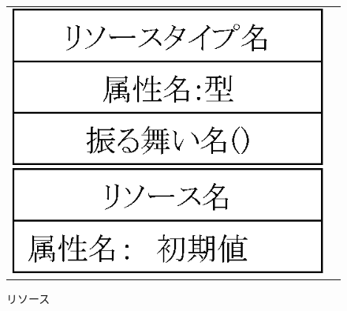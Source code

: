 \begin{figure}[p]
\begin{tabular}{cc}
\begin{minipage}{0.5\hsize}
\begin{center}
\includegraphics[scale=0.5]{img/resourceTypeSample.eps}
\caption{リソースタイプ}
\label{fig:resourceTypeSample}
\end{center}
\end{minipage}
\begin{minipage}{0.5\hsize}
\begin{center}
\includegraphics[scale=0.5]{img/resourceSample.eps}
\caption{リソース}
\label{fig:resourceSample}
\end{center}
\end{minipage}
\end{tabular}
\end{figure}

